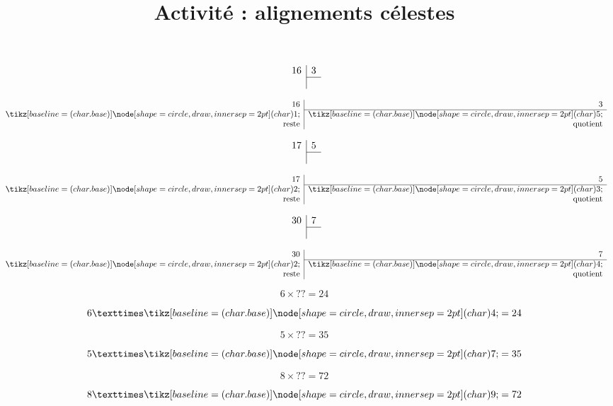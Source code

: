 \documentclass[a4paper]{beamer}
\title{Activité : alignements célestes}
\date{}
\author{}
\begin{document}
\begin{frame}
	$$
		\begin{array}{r|r}
			16 & 3 \\
			\cline{2-2}
			   &
		\end{array}
	$$
\end{frame}

\begin{frame}
	$$
		\begin{array}{r|r}
			16           & 3               \\
			\cline{2-2}
			\circled{1}  & \circled{5}     \\
			\text{reste} & \text{quotient}
		\end{array}
	$$
\end{frame}

\begin{frame}
	$$
		\begin{array}{r|r}
			17 & 5 \\
			\cline{2-2}
			   &
		\end{array}
	$$
\end{frame}

\begin{frame}
	$$
		\begin{array}{r|r}
			17           & 5               \\
			\cline{2-2}
			\circled{2}  & \circled{3}     \\
			\text{reste} & \text{quotient}
		\end{array}
	$$
\end{frame}

\begin{frame}
	$$
		\begin{array}{r|r}
			30 & 7 \\
			\cline{2-2}
			   &
		\end{array}
	$$
\end{frame}

\begin{frame}
	$$
		\begin{array}{r|r}
			30           & 7               \\
			\cline{2-2}
			\circled{2}  & \circled{4}     \\
			\text{reste} & \text{quotient}
		\end{array}
	$$
\end{frame}

\begin{frame}
	$$ 6 × ?? = 24 $$
\end{frame}

\begin{frame}
	$$ 6 × \circled{4} = 24 $$
\end{frame}

\begin{frame}
	$$ 5 × ?? = 35 $$
\end{frame}

\begin{frame}
	$$ 5 ×\circled{7} = 35 $$
\end{frame}

\begin{frame}
	$$ 8 × ?? = 72 $$
\end{frame}

\begin{frame}
	$$ 8 × \circled{9} = 72 $$
\end{frame}
\end{document}
